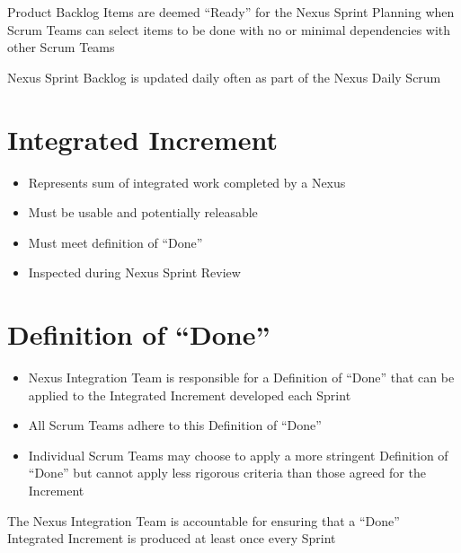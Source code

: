 \documentclass[a4paper,11pt,twocolumn]{article}
\begin{document}
\begin{tcolorbox}[colback=black!8!white,colframe=gray!50!black,title=Note,sharp corners,fonttitle=\normalsize\bfseries,fontupper=\normalsize]
	Product Backlog Items are deemed ``Ready'' for the Nexus Sprint Planning when Scrum Teams can select items to be done with no or minimal dependencies with other Scrum Teams
\end{tcolorbox}

\begin{tcolorbox}[colback=black!8!white,colframe=gray!50!black,title=Note,sharp corners,fonttitle=\normalsize\bfseries,fontupper=\normalsize]
	Nexus Sprint Backlog is updated daily often as part of the Nexus Daily Scrum
\end{tcolorbox}

\section*{Integrated Increment}
\begin{itemize}
	\item Represents sum of integrated work completed by a Nexus
	\item Must be usable and potentially releasable
	\item Must meet definition of ``Done''
	\item Inspected during Nexus Sprint Review
\end{itemize}

\section*{Definition of ``Done''}
\begin{itemize}
	\item Nexus Integration Team is responsible for a Definition of ``Done'' that can be applied to the Integrated Increment developed each Sprint
	\item All Scrum Teams adhere to this Definition of ``Done''
	\item Individual Scrum Teams may choose to apply a more stringent Definition of ``Done'' but cannot apply less rigorous criteria than those agreed for the Increment
\end{itemize}

\begin{tcolorbox}[colback=black!8!white,colframe=gray!50!black,title=Note,sharp corners,fonttitle=\normalsize\bfseries,fontupper=\normalsize]
	The Nexus Integration Team is accountable for ensuring that a ``Done'' Integrated Increment is produced at least once every Sprint
\end{tcolorbox}

\nocite{*}


\end{document}

